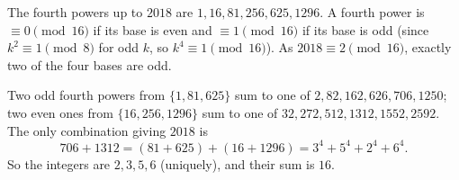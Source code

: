 The fourth powers up to $2018$ are $1,16,81,256,625,1296$. A fourth power is $\equiv0\pmod{16}$ if its base is even and $\equiv1\pmod{16}$ if its base is odd (since $k^2\equiv1\pmod8$ for odd $k$, so $k^4\equiv1\pmod{16}$). As $2018\equiv2\pmod{16}$, exactly two of the four bases are odd.

Two odd fourth powers from $\{1,81,625\}$ sum to one of $2,82,162,626,706,1250$; two even ones from $\{16,256,1296\}$ sum to one of $32,272,512,1312,1552,2592$. The only combination giving $2018$ is
\[
706+1312=(81+625)+(16+1296)=3^4+5^4+2^4+6^4 .
\]
So the integers are $2,3,5,6$ (uniquely), and their sum is $\boxed{16}$.
